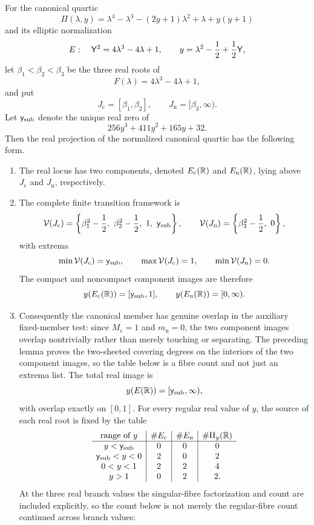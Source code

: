 \begin{theorem}\label{thm:theorem-b-real-projection-criterion}
For the canonical quartic
\[
\Pi(\lambda,y)=\lambda^4-\lambda^3-(2y+1)\lambda^2+\lambda+y(y+1)
\]
and its elliptic normalization
\[
E:\quad \mathsf{Y}^2=4\lambda^3-4\lambda+1,
\qquad
y=\lambda^2-\frac12+\frac12\mathsf{Y},
\]
let \(\beta_1<\beta_2<\beta_3\) be the three real roots of
\[
F(\lambda)=4\lambda^3-4\lambda+1,
\]
and put
\[
J_{\mathrm c}=[\beta_1,\beta_2],
\qquad
J_{\mathrm n}=[\beta_3,\infty).
\]
Let \(\mathsf{y}_{\mathrm{sub}}\) denote the unique real zero of
\[
256y^3+411y^2+165y+32.
\]
Then the real projection of the normalized canonical quartic has the following form.
\begin{enumerate}
\item The real locus has two components, denoted \(E_{\mathrm c}(\mathbb{R})\) and \(E_{\mathrm n}(\mathbb{R})\), lying above \(J_{\mathrm c}\) and \(J_{\mathrm n}\), respectively.
\item The complete finite transition framework is
\[
\mathcal V(J_{\mathrm c})=
\left\{\beta_1^2-\frac12,\ \beta_2^2-\frac12,\ 1,\ \mathsf{y}_{\mathrm{sub}}\right\},
\qquad
\mathcal V(J_{\mathrm n})=
\left\{\beta_3^2-\frac12,\ 0\right\},
\]
with extrema
\[
\min \mathcal V(J_{\mathrm c})=\mathsf{y}_{\mathrm{sub}},
\qquad
\max \mathcal V(J_{\mathrm c})=1,
\qquad
\min \mathcal V(J_{\mathrm n})=0.
\]
The compact and noncompact component images are therefore
\[
y(E_{\mathrm c}(\mathbb{R}))=[\mathsf{y}_{\mathrm{sub}},1],
\qquad
y(E_{\mathrm n}(\mathbb{R}))=[0,\infty).
\]
\item Consequently the canonical member has genuine overlap in the auxiliary fixed-member test: since $M_{\mathrm c}=1$ and $m_{\mathrm n}=0$, the two component images overlap nontrivially rather than merely touching or separating.  The preceding lemma proves the two-sheeted covering degrees on the interiors of the two component images, so the table below is a fibre count and not just an extrema list.  The total real image is
\[
y(E(\mathbb{R}))=[\mathsf{y}_{\mathrm{sub}},\infty),
\]
with overlap exactly on \([0,1]\).  For every regular real value of \(y\), the source of each real root is fixed by the table
\[
\begin{array}{c|c|c|c}
\text{range of }y & \#E_{\mathrm c} & \#E_{\mathrm n} & \#\Pi_y(\mathbb{R})\\
\hline
y<\mathsf{y}_{\mathrm{sub}} & 0 & 0 & 0\\
\mathsf{y}_{\mathrm{sub}}<y<0 & 2 & 0 & 2\\
0<y<1 & 2 & 2 & 4\\
y>1 & 0 & 2 & 2.
\end{array}
\]
At the three real branch values the singular-fibre factorization and count are included explicitly, so the count below is not merely the regular-fibre count continued across branch values:

\end{enumerate}
\end{theorem}
